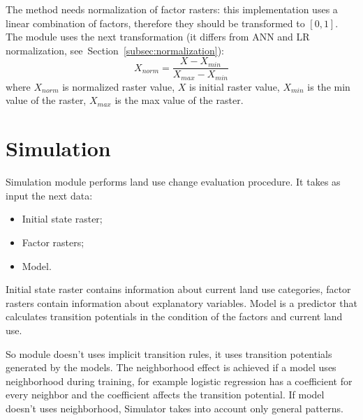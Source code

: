 \documentclass{report}
\begin{document}
The method needs normalization of factor rasters: this implementation uses a linear combination of factors, therefore they should be transformed to $[0,1]$. The module uses the next transformation (it differs from ANN and LR normalization, see~Section~\ref{subsec:normalization}):
$$
X_{norm} = \frac{X-X_{min}}{X_{max} - X_{min}}
$$
where $X_{norm}$ is normalized raster value, $X$ is initial raster value, $X_{min}$ is the min value of the raster, $X_{max}$ is the max value of the raster. 

\section{Simulation}\label{sec:simulation}

Simulation module performs land use change evaluation procedure. It takes as input the next data:
\begin{itemize}
    \item Initial state raster;
    \item Factor rasters;
    \item Model.
\end{itemize}

Initial state raster contains information about current land use categories, factor rasters contain information about explanatory variables. Model is a predictor that calculates transition potentials in the condition of the factors and current land use.

So module doesn't uses implicit transition rules, it uses transition potentials generated by the models. The neighborhood effect is achieved if a model uses neighborhood during training, for example logistic regression has a coefficient for every neighbor and the coefficient affects the transition potential. If model doesn't uses neighborhood, Simulator takes into account only general patterns. 
\end{document}
